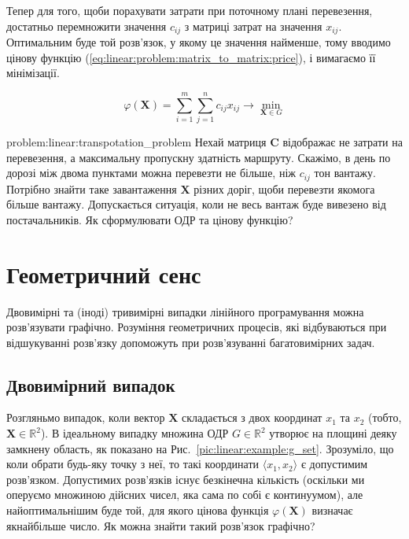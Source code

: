 \documentclass[\main/book.tex]{subfiles}
\begin{document}
Тепер для того, щоби порахувати затрати при поточному плані перевезення, достатньо перемножити значення $c_{ij}$ з матриці затрат на значення $x_{ij}$. Оптимальним буде той розв'язок, у якому це значення найменше, тому вводимо цінову функцію (\ref{eq:linear:problem:matrix_to_matrix:price}), і вимагаємо її мінімізації.

\begin{equation}
 \varphi(\mathbf{X}) =
 \sum_{i=1}^m \sum_{j=1}^n
 c_{ij} x_{ij}
 \rightarrow \min_{\mathbf{X} \in G}
 \label{eq:linear:problem:matrix_to_matrix:price}
\end{equation}

\begin{problem}{problem:linear:transpotation_problem}
 Нехай матриця $\mathbf{C}$ відображає не затрати на перевезення, а максимальну пропускну здатність маршруту. Скажімо, в день по дорозі між двома пунктами можна перевезти не більше, ніж $c_{ij}$ тон вантажу. Потрібно знайти таке завантаження $\mathbf{X}$ різних доріг, щоби перевезти якомога більше вантажу. Допускається ситуація, коли не весь вантаж буде вивезено від постачальників. Як сформулювати ОДР та цінову функцію?
\end{problem}

\section{Геометричний сенс}
\label{section:linear:geometrical}

Двовимірні та (іноді) тривимірні випадки лінійного програмування можна розв'язувати графічно. Розуміння геометричних процесів, які відбуваються при відшукуванні розв'язку допоможуть при розв'язуванні багатовимірних задач.

\subsection{Двовимірний випадок}

Розгляньмо випадок, коли вектор $\mathbf{X}$ складається з двох координат $x_1$ та $x_2$ (тобто, ${\mathbf{X} \in \mathbb{R}^2}$). В ідеальному випадку множина ОДР ${G \in \mathbb{R}^2}$ утворює на площині деяку замкнену область, як показано на Рис.~\ref{pic:linear:example:g_set}. Зрозуміло, що коли обрати будь-яку точку з неї, то такі координати ${\langle x_1, x_2 \rangle}$ є допустимим розв'язком. Допустимих розв'язків існує безкінечна кількість (оскільки ми оперуємо множиною дійсних чисел, яка сама по собі є континуумом), але найоптимальнішим буде той, для якого цінова функція $\varphi(\mathbf{X})$ визначає якнайбільше число. Як можна знайти такий розв'язок графічно?
\end{document}
